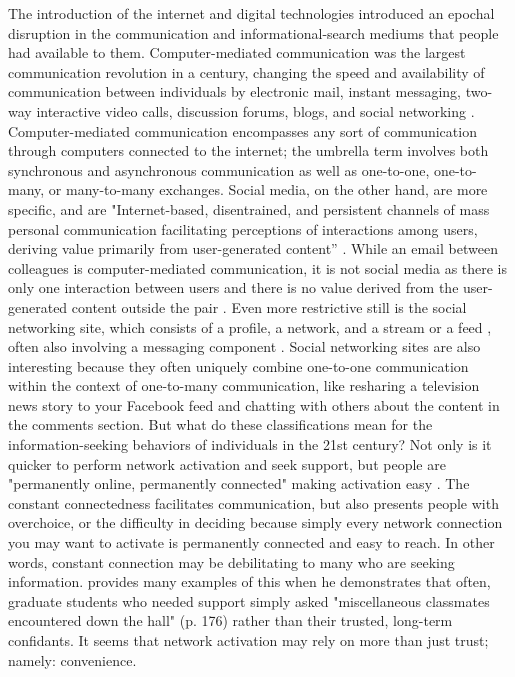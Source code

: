 The introduction of the internet and digital technologies introduced an epochal
disruption in the communication and informational-search mediums that people had
available to them. Computer-mediated communication was the largest communication
revolution in a century, changing the speed and availability of communication
between individuals by electronic mail, instant messaging, two-way interactive
video calls, discussion forums, blogs, and social networking
\citep{rainie2012networked}. Computer-mediated communication encompasses any
sort of communication through computers connected to the internet; the umbrella
term involves both synchronous and asynchronous communication as well as
one-to-one, one-to-many, or many-to-many exchanges. Social media, on the other
hand, are more specific, and are "Internet-based, disentrained, and persistent
channels of mass personal communication facilitating perceptions of interactions
among users, deriving value primarily from user-generated content” \citep[][p.
50]{carr2015social}. While an email between colleagues is computer-mediated
communication, it is not social media as there is only one interaction between
users and there is no value derived from the user-generated content outside the
pair \citep{bayer_etal20}. Even more restrictive still is the social networking
site, which consists of a profile, a network, and a stream or a feed
\citep{boyd2007social, ellison2013sociality},  often also involving a messaging
component  \citep{bayer_etal20}. Social networking sites are also interesting
because they often uniquely combine one-to-one communication within the context
of one-to-many communication, like resharing a television news story to your
Facebook feed and chatting with others about the content in the comments
section. But what do these classifications mean for the information-seeking
behaviors of individuals in the 21st century? Not only is it quicker to perform
network activation and seek support, but people are "permanently online,
permanently connected" making activation easy \citep{vorderer2017permanently}.
The constant connectedness facilitates communication, but also presents people
with overchoice, or the difficulty in deciding because simply every
network connection you may want to activate is permanently connected and easy to
reach. In other words, constant connection may be debilitating to many who are
seeking information. \citet{smallSomeoneTalk2017} provides many examples of this
when he demonstrates that often, graduate students who needed
support simply asked "miscellaneous classmates encountered down the hall" (p.
176) rather than their trusted, long-term confidants. It seems that network
activation may rely on more than just trust; namely: convenience.

